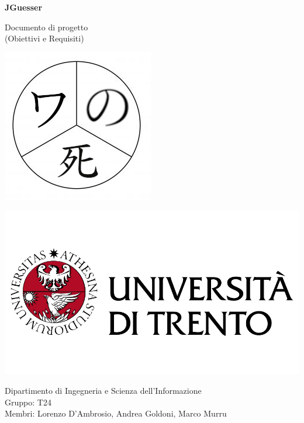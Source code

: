 \documentclass[11pt]{article}
\begin{document}
\begin{titlepage}
		\begin{center}
		    \Huge
			\textbf{JGuesser}
			
			\LARGE
			\vspace{0.85cm}
			Documento di progetto \\
            (Obiettivi e Requisiti)
			\vspace{0.5cm}
			
			\includegraphics[scale=2.5]{images/logo_progetto_se-t24.png}
			
			\vfill
			
		    \includegraphics[scale=0.200]{images/logo_unitn.png}
			
			\Large
			Dipartimento di Ingegneria e Scienza dell’Informazione \\
			Gruppo: T24 \\
			Membri: Lorenzo D'Ambrosio, Andrea Goldoni, Marco Murru
				
			\vspace{1.5cm}
    		
		\end{center}
	\end{titlepage}

\tableofcontents






\end{document}
